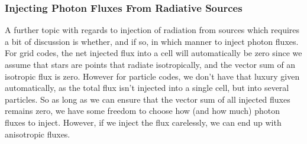 %
%
%
%
%
%
%
%
%
%
%
%






\subsubsection{Injecting Photon Fluxes From Radiative Sources}

A further topic with regards to injection of radiation from sources which requires a bit of
discussion is whether, and if so, in which manner to inject photon fluxes. For grid codes, the net
injected flux into a cell will automatically be zero since we assume that stars are points that
radiate isotropically, and the vector sum of an isotropic flux is zero. However for particle
codes, we don't have that luxury given automatically, as the total flux isn't injected into a
single cell, but into several particles. So as long as we can ensure that the vector sum of all
injected fluxes remains zero, we have some freedom to choose how (and how much) photon fluxes to
inject. However, if we inject the flux carelessly, we can end up with anisotropic fluxes.

